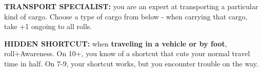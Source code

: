 \documentclass[oneside,10pt]{article}
\begin{document}
\begin{multicols}{2}
\textbf{TRANSPORT SPECIALIST:} you are an expert
at transporting a particular kind of cargo. Choose
a type of cargo from below - when carrying that
cargo, take +1 ongoing to all rolls.
\begin{moveoptions}
 





\end{moveoptions}

\textbf{HIDDEN SHORTCUT:} when \textbf{traveling
  in a vehicle or by foot}, roll+Awareness. On
10+, you know of a shortcut that cuts your normal travel
time in half. On 7-9, your shortcut works, but you
encounter trouble on the way.

\end{multicols}

\end{document}
